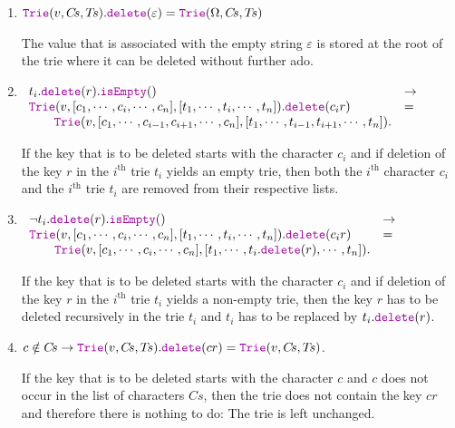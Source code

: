\begin{enumerate}
\item $\mytt{Trie}(v,C\!s,T\!s).\mytt{delete}(\varepsilon) = \mytt{Trie}(\Omega,C\!s,T\!s)$

      The value that is associated with the empty  string $\varepsilon$ is stored at the root of the
      trie where it can be deleted without further ado.
\item $\begin{array}[t]{ll}
       t_i.\mytt{delete}(r).\mytt{isEmpty}()   & \rightarrow \\
       \mytt{Trie}(v, [c_1,\cdots,c_i,\cdots,c_n],[t_1,\cdots,t_i,\cdots,t_n]).\mytt{delete}(c_ir) 
       & = \\
       \qquad 
       \mytt{Trie}(v, [c_1,\cdots,c_{i-1},c_{i+1},\cdots,c_n],[t_1,\cdots,t_{i-1},t_{i+1},\cdots,t_n]).
       \end{array}
       $

       If  the key that is to be deleted starts with the character $c_i$ and if deletion of  the key
       $r$ in the $i^\textrm{th}$  trie $t_i$ yields an empty
       trie, then both the $i^\textrm{th}$ character $c_i$ and the $i^\textrm{th}$ trie $t_i$ are removed from
       their respective lists.
\item $\begin{array}[t]{ll}
       \neg t_i.\mytt{delete}(r).\mytt{isEmpty}()   & \rightarrow \\
       \mytt{Trie}(v, [c_1,\cdots,c_i,\cdots,c_n],[t_1,\cdots,t_i,\cdots,t_n]).\mytt{delete}(c_ir) 
       & = \\
       \qquad \mytt{Trie}(v, [c_1,\cdots,c_i,\cdots,c_n],[t_1,\cdots,t_i.\mytt{delete}(r),\cdots,t_n]).
       \end{array}
       $

       If  the key that is to be deleted starts with the character $c_i$ and if deletion of  the key
       $r$ in the $i^\textrm{th}$  trie $t_i$ yields a non-empty trie, then the key $r$ has to be deleted recursively
       in the trie $t_i$ and $t_i$ has to be replaced by $t_i.\mytt{delete}(r)$.
\item $c \notin C\!s \rightarrow \mytt{Trie}(v, C\!s, T\!s).\mytt{delete}(cr) =
       \mytt{Trie}(v, C\!s, T\!s)$. 
       
       If  the key that is to be deleted starts with the character $c$ and $c$ does not occur in
       the list of characters $C\!s$, then the trie does not contain the key $cr$ and therefore there
       is nothing to do:  The trie is left unchanged.
\end{enumerate}

